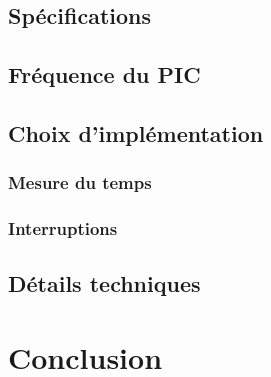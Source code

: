 \documentclass[12pt,a4paper]{article}
\begin{document}
    \subsection{Spécifications}
    \subsection{Fréquence du PIC}
    \subsection{Choix d'implémentation}
    \subsubsection{Mesure du temps}
    \subsubsection{Interruptions}
    \subsection{Détails techniques}
    
\section{Conclusion}
    
\end{document}

